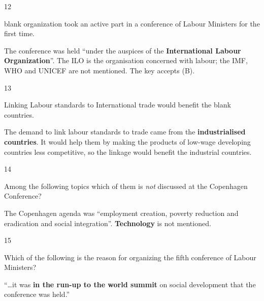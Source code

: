\begin{question}{12}
{blank{} organization took an active part in a conference of Labour Ministers for the first time.\par}
\begin{explain}
The conference was held ``under the auspices of the \textbf{International Labour Organization}''. The ILO is the organisation concerned with labour; the IMF, WHO and UNICEF are not mentioned. The key accepts (B).
\end{explain}
\end{question}

\begin{question}{13}
{Linking Labour standards to International trade would benefit the blank{} countries.\par}
\begin{explain}
The demand to link labour standards to trade came from the \textbf{industrialised countries}. It would help them by making the products of low-wage developing countries less competitive, so the linkage would benefit the industrial countries.
\end{explain}
\end{question}

\begin{question}{14}
{Among the following topics which of them is \emph{not} discussed at the Copenhagen Conference?\par}
\begin{explain}
The Copenhagen agenda was ``employment creation, poverty reduction and eradication and social integration''. \textbf{Technology} is not mentioned.
\end{explain}
\end{question}

\begin{question}{15}
{Which of the following is the reason for organizing the fifth conference of Labour Ministers?\par}
\begin{explain}
``\ldots it was \textbf{in the run-up to the world summit} on social development that the conference was held.''
\end{explain}
\end{question}

